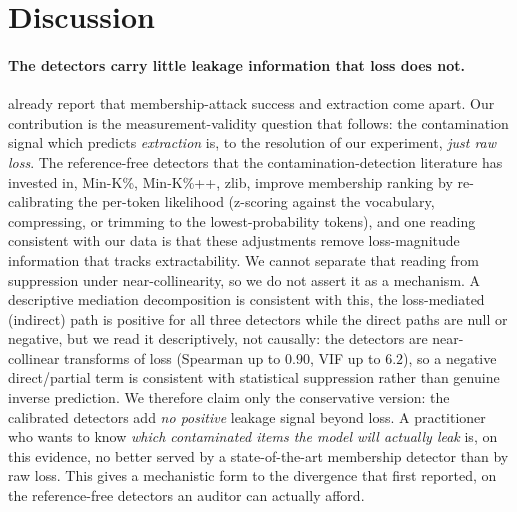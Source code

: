 \section{Discussion}
\label{sec:discussion}

\paragraph{The detectors carry little leakage information that loss does not.}
\citet{hayes2025strong} already report that membership-attack success and extraction come apart. Our
contribution is the measurement-validity question that follows: the contamination signal which
predicts \emph{extraction} is, to the resolution of our experiment, \emph{just raw loss}. The reference-free detectors that the contamination-detection
literature has invested in, Min-K\%, Min-K\%++, zlib, improve membership ranking by re-calibrating
the per-token likelihood (z-scoring against the vocabulary, compressing, or trimming to the
lowest-probability tokens), and one reading consistent with our data is that these adjustments
remove loss-magnitude information that tracks extractability. We cannot separate that reading from
suppression under near-collinearity, so we do not assert it as a mechanism. A descriptive mediation decomposition is consistent with
this, the loss-mediated (indirect) path is positive for all three detectors while the direct paths
are null or negative, but we read it descriptively, not causally: the detectors are near-collinear
transforms of loss (Spearman up to $0.90$, VIF up to $6.2$), so a negative direct/partial term is
consistent with statistical suppression rather than genuine inverse prediction. We therefore claim
only the conservative version: the calibrated detectors add \emph{no positive} leakage signal beyond
loss. A practitioner who wants to know \emph{which contaminated items the model will actually leak}
is, on this evidence, no better served by a state-of-the-art membership detector than by raw loss.
This gives a mechanistic form to the divergence that \citet{hayes2025strong} first reported, on the
reference-free detectors an auditor can actually afford.

